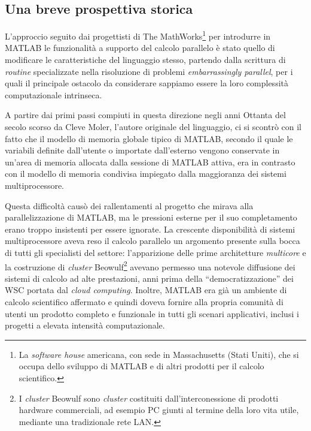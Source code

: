 \nocite{Sharma2009}
\subsection{Una breve prospettiva storica}
L'approccio seguito dai progettisti di The MathWorks\footnote{La \textit{software house} americana, con sede in Massachusetts (Stati Uniti), che si occupa dello sviluppo di MATLAB e di altri prodotti per il calcolo scientifico.}
per introdurre in MATLAB le funzionalit\`a a supporto del calcolo parallelo \`e stato quello di modificare le caratteristiche del linguaggio 
stesso, partendo dalla scrittura di \textit{routine} specializzate nella risoluzione di problemi \textit{embarrassingly parallel}, per i quali il principale ostacolo da considerare
sappiamo essere la loro complessit\`a computazionale intrinseca. 

A partire dai primi passi compiuti in questa direzione negli anni Ottanta del secolo scorso da Cleve Moler, l'autore originale del linguaggio, ci si scontr\`o 
con il fatto che il modello di memoria globale tipico di MATLAB, secondo il quale le variabili definite dall'utente o importate dall'esterno vengono conservate 
in un'area di memoria allocata dalla sessione di MATLAB attiva, era in contrasto con il modello di memoria condivisa impiegato dalla maggioranza dei sistemi 
multiprocessore.

Questa difficoltà causò dei rallentamenti al progetto che mirava alla parallelizzazione di MATLAB, ma le pressioni esterne per il suo completamento erano troppo insistenti per essere ignorate.\newline
La crescente disponibilit\`a di sistemi multiprocessore aveva reso il calcolo parallelo un argomento presente sulla bocca di tutti gli specialisti del 
settore: l'apparizione delle prime architetture \textit{multicore} e la costruzione di \textit{cluster} Beowulf\footnote{I \textit{cluster} Beowulf sono \textit{cluster} costituiti dall'interconessione di prodotti hardware commerciali, ad esempio PC giunti al termine della loro vita utile, mediante una tradizionale rete LAN. } avevano permesso una notevole diffusione dei sistemi di calcolo ad alte prestazioni, anni prima della \enquote{democratizzazione} dei WSC portata dal \textit{cloud computing}.\newline   
Inoltre, MATLAB era gi\`a un ambiente di calcolo scientifico affermato e quindi doveva fornire alla propria comunit\`a di utenti un prodotto completo e funzionale 
in tutti gli scenari applicativi, inclusi i progetti a elevata intensit\`a computazionale.


